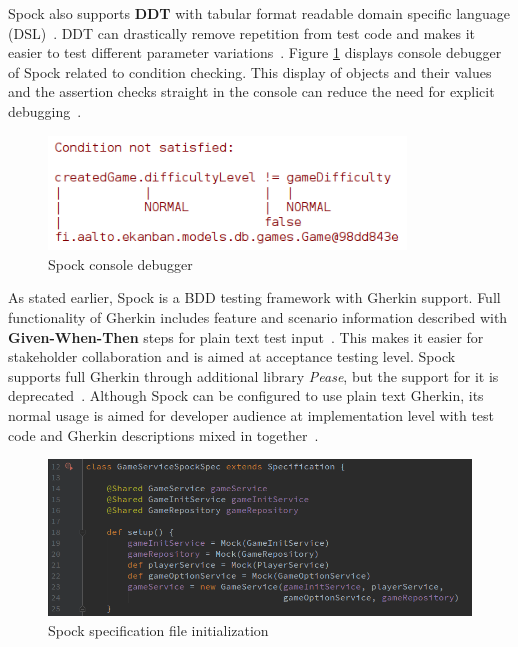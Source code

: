     Spock also supports \textbf{DDT} with tabular format readable
    domain specific language (DSL)~\cite{spock}.
    DDT can drastically remove repetition from test code and makes it easier to test different parameter
    variations~\cite{kapelonis2016java}.
    Figure \ref{fig:spock-debug} displays console debugger of Spock related to
    condition checking. This display of objects and their values and the assertion checks straight in the console
    can reduce the need for explicit debugging~\cite{kapelonis2016java}.
    \begin{figure}[ht]
      \begin{center}
        \includegraphics[width=9.5cm]{images/spock-debug.png}
        \caption{Spock console debugger}
        \label{fig:spock-debug}
      \end{center}
    \end{figure}

    As stated earlier, Spock is a BDD testing framework with Gherkin support.
    Full functionality of Gherkin includes feature and scenario information described
    with \textbf{Given-When-Then} steps for plain text test input~\cite{gherkin}. This makes it easier for stakeholder collaboration
    and is aimed at acceptance testing level.
    Spock supports full Gherkin through additional library \textit{Pease}, but the support for it is deprecated~\cite{spock-pease}.
    Although Spock can be configured to use plain text Gherkin, its normal usage is aimed for developer audience at implementation
    level with test code and Gherkin descriptions mixed in together~\cite{okolnychyi2016study}.

    \begin{figure}[ht]
      \begin{center}
        \includegraphics[width=13.7cm]{images/spock-init.png}
        \caption{Spock specification file initialization}
        \label{fig:spock-init}
      \end{center}
    \end{figure}

